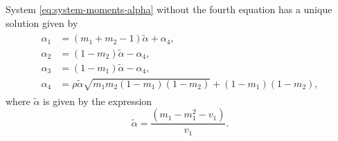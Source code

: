 \begin{proposition}
  \label{prop:solution-to-system-bivariate-beta}
  System \eqref{eq:system-moments-alpha} without the fourth equation has a unique solution given by 
\begin{gather}
 \label{eq:system-solution}
 \begin{aligned}
  \alpha_1 &= (m_1 + m_2 - 1)\tilde{\alpha} + \alpha_4, \\
  \alpha_2 &=  (1 - m_2)\tilde{\alpha} - \alpha_4, \\
  \alpha_3 &= (1-m_1)\tilde{\alpha} - \alpha_4, \\
  \alpha_4 &= \rho\tilde{\alpha}\sqrt{m_1m_2(1-m_1)(1-m_2)} + (1-m_1)(1-m_2),
\end{aligned}
\end{gather}
where $\tilde{\alpha}$ is given by the expression 
$$
\tilde{\alpha} = \frac{(m_1 - m_1^2 - v_1)}{v_1}.
$$
\end{proposition}

